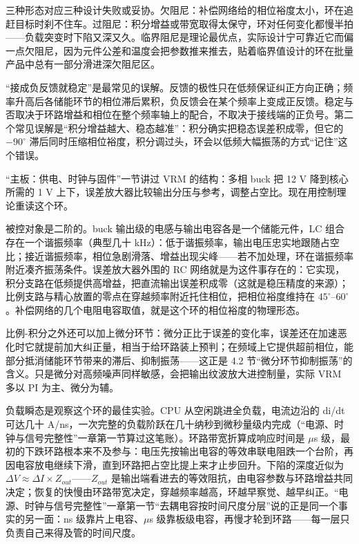 三种形态对应三种设计失败或妥协。欠阻尼：补偿网络给的相位裕度太小，环在追赶目标时刹不住车。过阻尼：积分增益或带宽取得太保守，环对任何变化都慢半拍——负载突变时下陷又深又久。临界阻尼是理论最优点，实际设计宁可靠近它而偏一点欠阻尼，因为元件公差和温度会把参数推来推去，贴着临界值设计的环在批量产品中总有一部分滑进深欠阻尼区。

\begin{warningbox}
“接成负反馈就稳定”是最常见的误解。反馈的极性只在低频保证纠正方向正确；频率升高后各储能环节的相位滞后累积，负反馈会在某个频率上变成正反馈。稳定与否取决于环路增益和相位在整个频率轴上的配合，不取决于接线端的正负号。第二个常见误解是“积分增益越大、稳态越准”：积分确实把稳态误差积成零，但它的 $-90^{\circ}$ 滞后同时压缩相位裕度，积分调过头，环会以低频大幅振荡的方式“记住”这个错误。
\end{warningbox}


“主板：供电、时钟与固件”一节讲过 VRM 的结构：多相 buck 把 12 V 降到核心所需的 1 V 上下，误差放大器比较输出分压与参考，调整占空比。现在用控制理论重读这个环。

被控对象是二阶的。buck 输出级的电感与输出电容各是一个储能元件，LC 组合存在一个谐振频率（典型几十 kHz）：低于谐振频率，输出电压忠实地跟随占空比；接近谐振频率，相位急剧滑落、增益出现尖峰——若不加处理，环在谐振频率附近凑齐振荡条件。误差放大器外围的 RC 网络就是为这件事存在的：它实现，积分支路在低频提供高增益，把直流输出误差积成零（这就是稳压精度的来源）；比例支路与精心放置的零点在穿越频率附近托住相位，把相位裕度维持在 $45^{\circ}$--$60^{\circ}$。补偿网络的几个电阻电容取值，就是这个环的相位裕度的物理形态。

比例-积分之外还可以加上微分环节：微分正比于误差的变化率，误差还在加速恶化时它就提前加大纠正量，相当于给环路装上预判；在频域上它提供超前相位，能部分抵消储能环节带来的滞后、抑制振荡——这正是 4.2 节“微分环节抑制振荡”的含义。只是微分对高频噪声同样敏感，会把输出纹波放大进控制量，实际 VRM 多以 PI 为主、微分为辅。

负载瞬态是观察这个环的最佳实验。CPU 从空闲跳进全负载，电流边沿的 di/dt 可达几十 A/ns，一次完整的负载阶跃在几十纳秒到微秒量级内完成（“电源、时钟与信号完整性”一章第一节算过这笔账）。环路带宽折算成响应时间是 $\mu$s 级，最初的下跌环路根本来不及参与：电压先按输出电容的等效串联电阻跌一个台阶，再因电容放电继续下滑，直到环路把占空比提上来才止步回升。下陷的深度近似为 $\Delta V \approx \Delta I \times Z_{out}$——$Z_{out}$ 是输出端看进去的等效阻抗，由电容参数与环路增益共同决定；恢复的快慢由环路带宽决定，穿越频率越高，环越早察觉、越早纠正。“电源、时钟与信号完整性”一章第一节“去耦电容按时间尺度分层”说的正是同一个事实的另一面：ns 级靠片上电容、$\mu$s 级靠板级电容，再慢才轮到环路——每一层只负责自己来得及管的时间尺度。

